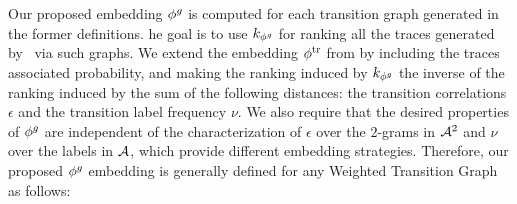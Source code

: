 {Our proposed embedding ${\phi^{g}}$ is computed for each transition graph generated in the former definitions. he goal is to use
$k_{{\phi^{g}}}$ for ranking all the traces generated by \unravelling\ via such graphs. We extend the embedding ${\phi^{\text{tr}}}$ from 
\cite{LodhiSSCW02} by including the traces associated probability, and making the ranking induced by $k_{{\phi^{g}}}$ the inverse of 
the ranking induced by the
sum of the following distances: the transition correlations $\epsilon$ and the transition label frequency $\nu$.}
{We also require that the desired properties of ${\phi^{g}}$ are independent of the characterization of $\epsilon$ over the 
$2$-grams in $\mathcal{A}^2$ and $\nu$ over the labels in $\mathcal{A}$, which  provide different embedding strategies. } Therefore, our proposed ${\phi^{g}}$ embedding is {generally} defined {for any Weighted Transition Graph} as follows:


